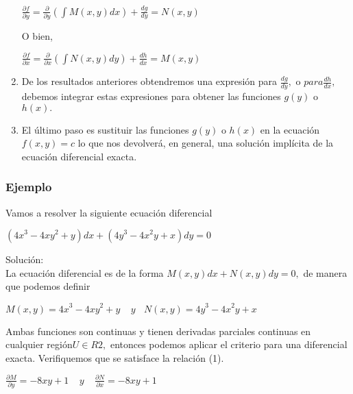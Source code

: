\documentclass[l etterpaper,11pt]{article}
\begin{document}
\begin{enumerate}
\begin{center}
$\frac{\partial f}{\partial y}=\frac{\partial}{\partial y}(\int M(x,y)dx)+\frac{dg}{dy}=N(x,y)$\\
\end{center}

\begin{flushleft}
O bien,\\
 \end{flushleft}
\begin{center}
$\frac{\partial f}{\partial x}=\frac{\partial}{\partial x}(\int N(x,y)dy)+\frac{dh}{dx}=M(x,y)$\\
\end{center}

\item De los resultados anteriores obtendremos una expresión para $\frac{dg}{dy}, $ o $ para \frac{dh}{dx}, $ debemos integrar estas expresiones para obtener las funciones $ g(y) $ o $ h(x).$
\item El último paso es sustituir las funciones $ g(y) $ o $ h(x) $ en la ecuación $ f(x,y)=c  $ lo que nos devolverá, en general, una solución implícita de la ecuación diferencial exacta.
\end{enumerate}



\subsubsection{Ejemplo}

Vamos a resolver la siguiente ecuación diferencial
\begin{center}

$({4x}^3-{4xy}^2+y)dx+({4y}^3-{4x}^2y+x)dy=0$\\

\end{center}

Solución:\\
La ecuación diferencial es de la forma $ M(x,y)dx+N(x,y)dy=0 ,$ de manera que podemos definir
\begin{center}
$M(x,y)={4x}^3-{4xy}^2+y\ \ \ \ \ y\ \ \ \ N(x,y)={4y}^3-{4x}^2y+x$\\
\end{center}

Ambas funciones son continuas y tienen derivadas parciales continuas en cualquier región$  U\in R2,  $ entonces podemos aplicar el criterio para una diferencial exacta. Verifiquemos que se satisface la relación (1).
\begin{center}

$\frac{\partial M}{\partial y}=-8xy+1\ \ \ \ \ y\ \ \ \ \ \frac{\partial N}{\partial x}=-8xy+1$\\
\end{center}
\end{document}
